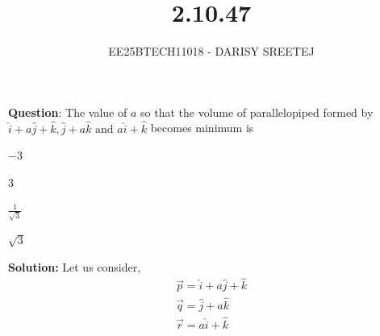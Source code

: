 \documentclass[journal]{IEEEtran}
\begin{document}

\vspace{3cm}

\title{2.10.47}
\author{EE25BTECH11018 - DARISY SREETEJ}
{\let\newpage\relax\maketitle}

\renewcommand{\thefigure}{\theenumi}
\renewcommand{\thetable}{\theenumi}
\setlength{\intextsep}{10pt} %


\renewcommand{\thetable}{\theenumi}


\textbf{Question}:
The value of $a$ so that the volume of parallelopiped formed by $\hat{i} + a\hat{j} + \hat{k}, \hat{j} + a\hat{k} \text{ and } a\hat{i} + \hat{k}$ becomes minimum is
\begin{enumerate}
\begin{multicols}{4}
\item $-3$
\item $3$
\item $\frac{1}{\sqrt{3}}$
\item $\sqrt{3}$
\end{multicols}
\end{enumerate}
\textbf{Solution:}
Let us consider,
\begin{align*}
\vec{p}=\hat{i}+a\hat{j}+\hat{k}\\
\vec{q}=\hat{j}+a\hat{k}\\
\vec{r}=a\hat{i}+\hat{k}
\end{align*}
\end{document}

